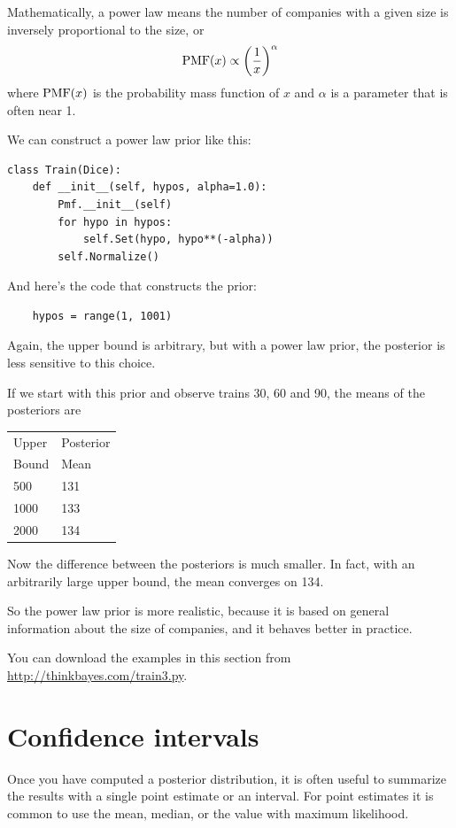 \documentclass[12pt]{book}
\begin{document}
Mathematically, a power law means the number of companies
with a given size is inversely proportional to the size, or
%
\[ \mathrm{PMF}(x) \propto \left( \frac{1}{x} \right)^{\alpha}   \]
%
where $\mathrm{PMF}(x)$ is the probability mass function of $x$ and $\alpha$ is
a parameter that is often near 1.

We can construct a power law prior like this:

\begin{verbatim}
class Train(Dice):
    def __init__(self, hypos, alpha=1.0):
        Pmf.__init__(self)
        for hypo in hypos:
            self.Set(hypo, hypo**(-alpha))
        self.Normalize()
\end{verbatim}

And here's the code that constructs the prior:

\begin{verbatim}
    hypos = range(1, 1001)
\end{verbatim}

Again, the upper bound is arbitrary, but with a power law
prior, the posterior is less sensitive to this choice.

If we start with this prior and observe trains 30, 60 and 90,
the means of the posteriors are

  \begin{tabular}{|l|l|}
  \hline
  Upper & Posterior \\
  Bound & Mean \\
  \hline
  500 & 131 \\
  1000 & 133 \\
  2000 & 134 \\
  \hline
  \end{tabular}

Now the difference between the posteriors is much smaller.  In fact,
with an arbitrarily large upper bound, the mean converges on 134.

So the power law prior is more realistic, because it is based on
general information about the size of companies, and it
behaves better in practice.

You can download the examples in this section from
\url{http://thinkbayes.com/train3.py}.

\section{Confidence intervals}

Once you have computed a posterior distribution, it is often useful
to summarize the results with a single point estimate or an interval.
For point estimates it is common to use the mean, median, or the
value with maximum likelihood.
\end{document}
